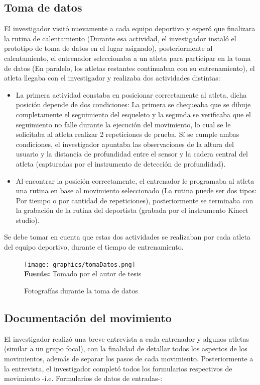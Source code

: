\subsection{Toma de datos}
El investigador visit\'o nuevamente a cada equipo deportivo y esper\'o que finalizara la rutina de calentamiento (Durante esa actividad, el investigador instal\'o el prototipo de toma de datos en el lugar asignado), posteriormente al calentamiento, el entrenador seleccionaba a un atleta para participar en la toma de datos (En paralelo, los atletas restantes continuaban con su entrenamiento), el atleta llegaba con el investigador y realizaba dos actividades distintas:
\begin{itemize}
\item La primera actividad constaba en posicionar correctamente al atleta, dicha posici\'on depende de dos condiciones: La primera se chequeaba que se dibuje completamente el seguimiento del esqueleto y la segunda se verificaba que el seguimiento no falle durante la ejecuci\'on del movimiento, lo cual se le solicitaba al atleta realizar 2 repeticiones de prueba. S\'i se cumple ambas condiciones, el investigador apuntaba las observaciones de la altura del usuario y la distancia de profundidad entre el sensor y la cadera central del atleta (capturadas por el instrumento de detecci\'on de profundidad).
\item Al encontrar la posici\'on correctamente, el entrenador le programaba al atleta una rutina en base al movimiento seleccionado (La rutina puede ser dos tipos: Por tiempo o por cantidad de repeticiones), posteriormente se terminaba con la grabaci\'on de la rutina del deportista (grabada por el instrumento Kinect studio).
\end{itemize}
Se debe tomar en cuenta que estas dos actividades se realizaban por cada atleta del equipo deportivo, durante el tiempo de entrenamiento.
 \begin{figure}[H]
	\caption{Fotograf\'ias durante la toma de datos}
	\label{fig:getDataStep}
	\centering
	\texttt{[image: graphics/tomaDatos.png]} \\
	\textbf{Fuente:} Tomado por el autor de tesis
\end{figure} 
\subsection{Documentaci\'on del movimiento}
El investigador realiz\'o una breve entrevista a cada entrenador y algunos atletas (similar a un grupo focal), con la finalidad de detallar todos los aspectos de los movimientos, adem\'as de separar los pasos de cada movimiento. Posteriormente a la entrevista, el investigador complet\'o todos los formularios respectivos de movimiento -i.e. Formularios de datos de entradas-:
